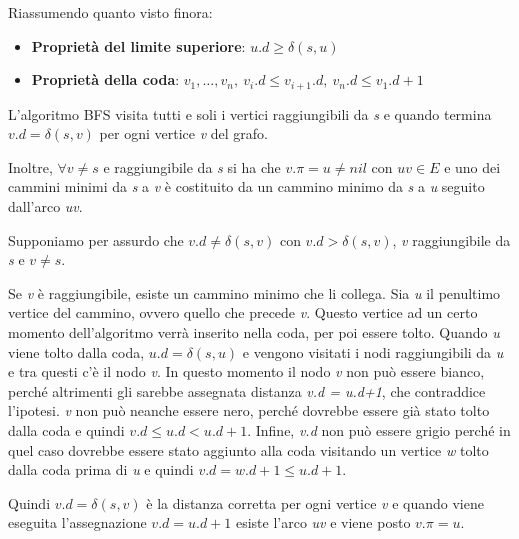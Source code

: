 
Riassumendo quanto visto finora:

\begin{itemize}
\item
  \textbf{Proprietà del limite superiore}: $u.d \geq \delta(s,u)$ 
\item
  \textbf{Proprietà della coda}: $v_1, \ldots, v_n, \: v_i.d \leq v_{i+1}.d, \: v_n.d \leq v_1.d+1$ 
\end{itemize}

L'algoritmo BFS visita tutti e soli i vertici raggiungibili da \emph{s} e
quando termina $v.d = \delta(s,v)$ per ogni vertice \emph{v} del
grafo.

Inoltre, $\forall v \neq s$ e raggiungibile da \emph{s} si ha che $v.\pi
= u \neq nil$ con $uv \in E$ e uno dei cammini minimi da \emph{s} a
\emph{v} è costituito da un cammino minimo da \emph{s} a \emph{u}
seguito dall'arco \emph{uv}.

Supponiamo per assurdo che $v.d \neq \delta(s,v)$ con $v.d > \delta(s,v)$, \emph{v} raggiungibile da \emph{s} e
$v\neq s$.

Se \emph{v} è raggiungibile, esiste un cammino minimo che li collega.
Sia \emph{u} il penultimo vertice del cammino, ovvero quello che precede
\emph{v}. Questo vertice ad un certo momento dell'algoritmo verrà
inserito nella coda, per poi essere tolto. Quando \emph{u} viene tolto
dalla coda, $u.d = \delta(s,u)$ e vengono visitati i nodi
raggiungibili da \emph{u} e tra questi c'è il nodo \emph{v}. In questo
momento il nodo \emph{v} non può essere bianco, perché altrimenti gli
sarebbe assegnata distanza \emph{v.d = u.d+1}, che contraddice
l'ipotesi. \emph{v} non può neanche essere nero, perché dovrebbe essere
già stato tolto dalla coda e quindi $v.d \leq u.d < u.d+1$. Infine, \emph{v.d} non può essere grigio perché in
quel caso dovrebbe essere stato aggiunto alla coda visitando un vertice
\emph{w} tolto dalla coda prima di \emph{u} e quindi $v.d = w.d+1
\leq u.d+1$.

Quindi $v.d = \delta(s,v)$ è la distanza corretta per ogni vertice
\emph{v} e quando viene eseguita l'assegnazione $v.d = u.d+1$
esiste l'arco \emph{uv} e viene posto $v.\pi = u$.

